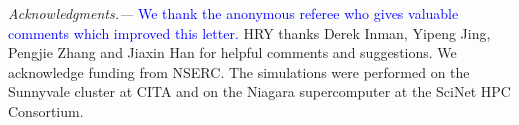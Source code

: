 \documentclass[aps,prd,twocolumn,amsmath,amssymb,amsfont,superscriptaddress,nofootinbib]{revtex4-1}
\newcommand{\tcb}{\textcolor{blue}}
\begin{document}
\textit{Acknowledgments.---}
\tcb{We thank the anonymous referee who gives valuable comments which improved this letter.} 
HRY thanks Derek Inman, Yipeng Jing, Pengjie Zhang and Jiaxin Han for helpful comments and suggestions.
We acknowledge funding from NSERC.
The simulations were performed on the Sunnyvale cluster at CITA and on the Niagara supercomputer at the SciNet HPC Consortium.



%

\end{document}
